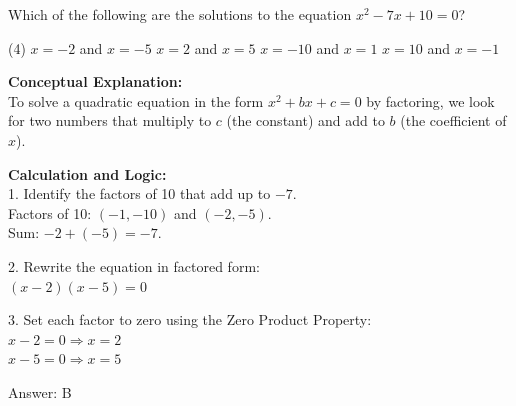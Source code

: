 \documentclass[11pt,paper=a4,answers]{exam}
\begin{document}
\begin{questions}
\pointsinrightmargin
\pointsdroppedatright
\marksnotpoints
{}
\pointformat{\boldmath\themarginpoints}
\bracketedpoints



\question
Which of the following are the solutions to the equation $x^2 - 7x + 10 = 0$?
\begin{tasks}(4)
    \task $x = -2$ and $x = -5$
    \task $x = 2$ and $x = 5$
    \task $x = -10$ and $x = 1$
    \task $x = 10$ and $x = -1$
\end{tasks}

\begin{solution}
\textbf{Conceptual Explanation:} \\
To solve a quadratic equation in the form $x^2 + bx + c = 0$ by factoring, we look for two numbers that multiply to $c$ (the constant) and add to $b$ (the coefficient of $x$).

\vspace{15pt}

\textbf{Calculation and Logic:} \\
1. Identify the factors of 10 that add up to $-7$. \\
   Factors of 10: $(-1, -10)$ and $(-2, -5)$. \\
   Sum: $-2 + (-5) = -7$.

\vspace{10pt}

2. Rewrite the equation in factored form: \\
   $(x - 2)(x - 5) = 0$

\vspace{10pt}

3. Set each factor to zero using the Zero Product Property: \\
   $x - 2 = 0 \Rightarrow x = 2$ \\
   $x - 5 = 0 \Rightarrow x = 5$

\vspace{20pt}

Answer: \colorbox{yellow!100}{B}
\end{solution}


\end{questions}
\end{document}
